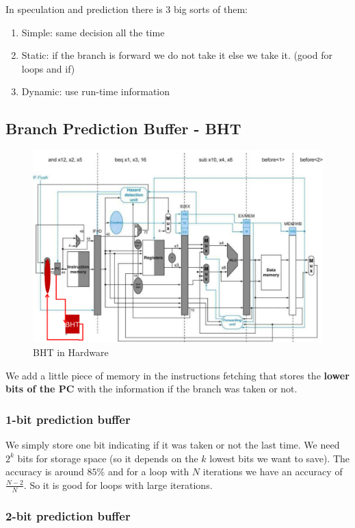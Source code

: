 \documentclass{report}
\begin{document}
In speculation and prediction there is 3 big sorts of them:

\begin{enumerate}
    \item Simple: same decision all the time
    \item Static: if the branch is forward we do not take it else we take it. (good for loops and if)
    \item Dynamic: use run-time information
\end{enumerate}

\subsection{Branch Prediction Buffer - BHT}

\begin{figure}[H]
    \centering
    \includegraphics[width=0.65\linewidth]{BHT_hw.png}
    \caption{BHT in Hardware}
    \label{fig:BHT-label}
\end{figure}

We add a little piece of memory in the instructions fetching that stores the \textbf{lower bits of the PC} with the information if the branch was taken or not.

\subsubsection{1-bit prediction buffer}

We simply store one bit indicating if it was taken or not the last time. We need $2^k$ bits for storage space (so it depends on the $k$ lowest bits we want to save). The accuracy is around $85\%$ and for a loop with $N$ iterations we have an accuracy of $\frac{N- 2}{N}$. So it is good for loops with large iterations.

\subsubsection{2-bit prediction buffer}
\end{document}
